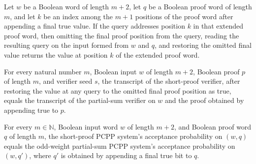 \begin{theorem}
\label{FABL.restoreFinalTrueProofValue_omit_proof}
\leanok
{}
Let $w$ be a Boolean word of length $m+2$, let $q$ be a Boolean proof word of length
$m$, and let $k$ be an index among the $m+1$ positions of the proof word after appending
a final true value. If the query addresses position $k$ in that extended proof word,
then omitting the final proof position from the query, reading the resulting query on
the input formed from $w$ and $q$, and restoring the omitted final value returns the
value at position $k$ of the extended proof word.
\end{theorem}

\begin{theorem}
\label{FABL.oddWeightShortProofPCPPSystem_transcript}
\leanok
{}
For every natural number $m$, Boolean input $w$ of length $m+2$, Boolean proof $p$ of
length $m$, and verifier seed $s$, the transcript of the short-proof verifier, after
restoring the value at any query to the omitted final proof position as true, equals the
transcript of the partial-sum verifier on $w$ and the proof obtained by appending true
to $p$.
\end{theorem}

\begin{theorem}
\label{FABL.oddWeightShortProofPCPPSystem_acceptanceProbability}
\leanok
{}
For every $m\in\mathbb{N}$, Boolean input word $w$ of length $m+2$, and Boolean proof
word $q$ of length $m$, the short-proof PCPP system's acceptance probability on $(w,q)$
equals the odd-weight partial-sum PCPP system's acceptance probability on $(w,q')$,
where $q'$ is obtained by appending a final true bit to $q$.
\end{theorem}

